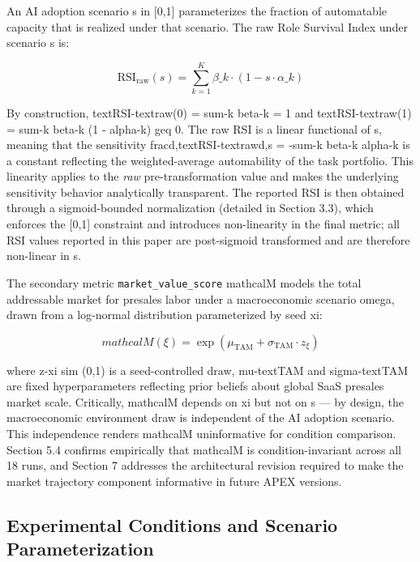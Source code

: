 \documentclass[10pt, conference]{IEEEtran}
\begin{document}
An AI adoption scenario s in [0,1] parameterizes the fraction of automatable capacity that is realized under that scenario. The raw Role Survival Index under scenario s is:

\begin{equation}
\text{RSI}_{\text{raw}}(s) = \sum_{k=1}^{K} \beta\_k \cdot \left(1 - s \cdot \alpha\_k\right)
\end{equation}

By construction, textRSI-textraw(0) = sum-k beta-k = 1 and textRSI-textraw(1) = sum-k beta-k (1 - alpha-k) geq 0. The raw RSI is a linear functional of s, meaning that the sensitivity fracd,textRSI-textrawd,s = -sum-k beta-k alpha-k is a constant reflecting the weighted-average automability of the task portfolio. This linearity applies to the \textit{raw} pre-transformation value and makes the underlying sensitivity behavior analytically transparent. The reported RSI is then obtained through a sigmoid-bounded normalization (detailed in Section 3.3), which enforces the [0,1] constraint and introduces non-linearity in the final metric; all RSI values reported in this paper are post-sigmoid transformed and are therefore non-linear in s.

The secondary metric \texttt{market\_value\_score} mathcalM models the total addressable market for presales labor under a macroeconomic scenario omega, drawn from a log-normal distribution parameterized by seed xi:

\begin{equation}
mathcalM(\xi) = \exp\left(\mu_{\text{TAM}} + \sigma_{\text{TAM}} \cdot z_\xi\right)
\end{equation}

where z-xi sim (0,1) is a seed-controlled draw, mu-textTAM and sigma-textTAM are fixed hyperparameters reflecting prior beliefs about global SaaS presales market scale. Critically, mathcalM depends on xi but not on s --- by design, the macroeconomic environment draw is independent of the AI adoption scenario. This independence renders mathcalM uninformative for condition comparison. Section 5.4 confirms empirically that mathcalM is condition-invariant across all 18 runs, and Section 7 addresses the architectural revision required to make the market trajectory component informative in future APEX versions.

\subsection{Experimental Conditions and Scenario Parameterization}
\end{document}

